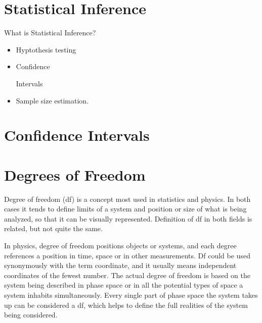  



 








 

\section{Statistical Inference} What is Statistical Inference?

\begin{itemize}\item Hyptothesis testing \item Confidence

Intervals \item Sample size estimation.\end{itemize}

 



\section{Confidence Intervals}

 


 



\section{Degrees of Freedom}

 

Degree of freedom (df) is a concept most used in statistics and physics. In both cases it tends to define limits of a system and position or size of what is being analyzed, so that it can be visually represented. Definition of df in both fields is related, but not quite the same.

 

In physics, degree of freedom positions objects or systems, and each degree references a position in time, space or in other measurements. Df could be used synonymously with the term coordinate, and it usually means independent coordinates of the fewest number. The actual degree of freedom is based on the system being described in phase space or in all the potential types of space a system inhabits simultaneously. Every single part of phase space the system takes up can be considered a df, which helps to define the full realities of the system being considered.

